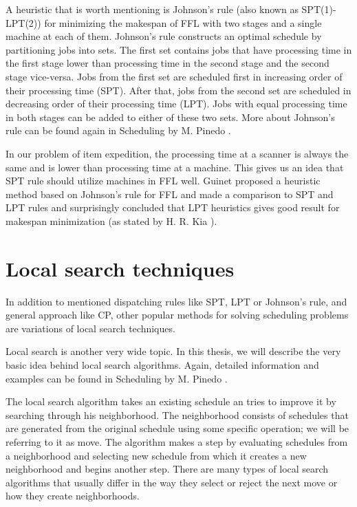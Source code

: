 \documentclass{ctuthesis}
\begin{document}
A heuristic that is worth mentioning is Johnson's rule (also known as SPT(1)-LPT(2)) for minimizing the makespan of FFL with two stages and a single machine at each of them. Johnson's rule constructs an optimal schedule by partitioning jobs into sets. The first set contains jobs that have processing time in the first stage lower than processing time in the second stage and the second stage vice-versa. 
Jobs from the first set are scheduled first in increasing order of their processing time (SPT). After that, jobs from the second set are scheduled in decreasing order of their processing time (LPT). Jobs with equal processing time in both stages can be added to either of these two sets. More about Johnson's rule can be found again in Scheduling by M. Pinedo \cite{pinedo}.

In our problem of item expedition, the processing time at a scanner is always the same and is lower than processing time at a machine. This gives us an idea that SPT rule should utilize machines in FFL well. Guinet \cite{guinet} proposed a heuristic method based on Johnson's rule for FFL and made a comparison to SPT and LPT rules and surprisingly concluded that LPT heuristics gives good result for makespan minimization (as stated by H. R. Kia \cite{kia}).



\section{Local search techniques}

In addition to mentioned dispatching rules like SPT, LPT or Johnson's rule, and general approach like CP, other popular methods for solving scheduling problems are variations of local search techniques.

Local search is another very wide topic. In this thesis, we will describe the very basic idea behind local search algorithms. Again, detailed information and examples can be found in Scheduling by M. Pinedo \cite{pinedo}. 

The local search algorithm takes an existing schedule an tries to improve it by searching through his neighborhood. The neighborhood consists of schedules that are generated from the original schedule using some specific operation; we will be referring to it as move. The algorithm makes a step by evaluating schedules from a neighborhood and selecting new schedule from which it creates a new neighborhood and begins another step. There are many types of local search algorithms that usually differ in the way they select or reject the next move or how they create neighborhoods. 
\end{document}
